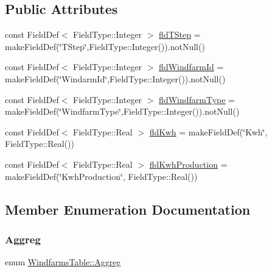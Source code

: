 \subsection*{Public Attributes}
\begin{DoxyCompactItemize}
\item 
const Field\+Def$<$ Field\+Type\+::\+Integer $>$ \mbox{\hyperlink{class_windfarms_table_a237f9960b4a08d37769a10c43717d574}{fld\+T\+Step}} = make\+Field\+Def(\char`\"{}T\+Step\char`\"{},Field\+Type\+::\+Integer()).not\+Null()
\item 
const Field\+Def$<$ Field\+Type\+::\+Integer $>$ \mbox{\hyperlink{class_windfarms_table_a3bf4f700e6b6a28688e0c9401036a624}{fld\+Windfarm\+Id}} = make\+Field\+Def(\char`\"{}Windarm\+Id\char`\"{},Field\+Type\+::\+Integer()).not\+Null()
\item 
const Field\+Def$<$ Field\+Type\+::\+Integer $>$ \mbox{\hyperlink{class_windfarms_table_ae386df578cdf8c90a1a9c05b021902eb}{fld\+Windfarm\+Type}} = make\+Field\+Def(\char`\"{}Windfarm\+Type\char`\"{},Field\+Type\+::\+Integer()).not\+Null()
\item 
const Field\+Def$<$ Field\+Type\+::\+Real $>$ \mbox{\hyperlink{class_windfarms_table_abb0742252486f902c65c898415fb6415}{fld\+Kwh}} = make\+Field\+Def(\char`\"{}Kwh\char`\"{}, Field\+Type\+::\+Real())
\item 
const Field\+Def$<$ Field\+Type\+::\+Real $>$ \mbox{\hyperlink{class_windfarms_table_a224d5ca48972136c2b469b86ddd7a4c1}{fld\+Kwh\+Production}} = make\+Field\+Def(\char`\"{}Kwh\+Production\char`\"{}, Field\+Type\+::\+Real())
\end{DoxyCompactItemize}


\subsection{Member Enumeration Documentation}
\mbox{\label{class_windfarms_table_a59a8562d196d503dd3420e06a4613696}} 
\subsubsection{\texorpdfstring{Aggreg}{Aggreg}}
{\footnotesize\ttfamily enum \mbox{\hyperlink{class_windfarms_table_a59a8562d196d503dd3420e06a4613696}{Windfarms\+Table\+::\+Aggreg}}\hspace{0.3cm}{\ttfamily [strong]}}

